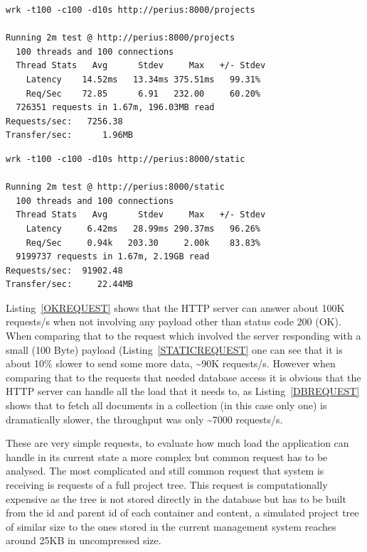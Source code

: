 \documentclass[a4paper,12pt]{article}
\newenvironment{custommargins}[2]%
  {\addtolength{\leftskip}{#1}\addtolength{\rightskip}{#2}}{\par}
\begin{document}
\begin{custommargins}{0cm}{-2cm}
\begin{minipage}{\linewidth-1cm}
\begin{lstlisting}[label=DBREQUEST,caption=Result of MongoDB requests]
wrk -t100 -c100 -d10s http://perius:8000/projects

Running 2m test @ http://perius:8000/projects
  100 threads and 100 connections
  Thread Stats   Avg      Stdev     Max   +/- Stdev
    Latency    14.52ms   13.34ms 375.51ms   99.31%
    Req/Sec    72.85      6.91   232.00     60.20%
  726351 requests in 1.67m, 196.03MB read
Requests/sec:   7256.38
Transfer/sec:      1.96MB
\end{lstlisting}
\end{minipage}

\begin{minipage}{\linewidth-1cm}
\begin{lstlisting}[label=STATICREQUEST,caption=Result of static text requests]
wrk -t100 -c100 -d10s http://perius:8000/static

Running 2m test @ http://perius:8000/static
  100 threads and 100 connections
  Thread Stats   Avg      Stdev     Max   +/- Stdev
    Latency     6.42ms   28.99ms 290.37ms   96.26%
    Req/Sec     0.94k   203.30     2.00k    83.83%
  9199737 requests in 1.67m, 2.19GB read
Requests/sec:  91902.48
Transfer/sec:     22.44MB
\end{lstlisting}
\end{minipage}
\end{custommargins}

Listing~\ref{OKREQUEST} shows that the HTTP server can answer about 100K requests/s when not
involving any payload other than status code 200 (OK). When comparing that to the request which
involved the server responding with a small (100 Byte) payload (Listing~\ref{STATICREQUEST} one can
see that it is about 10\% slower to send some more data, \textasciitilde90K requests/s. However when
comparing that to the requests that needed database access it is obvious that the HTTP server can
handle all the load that it needs to, as Listing~\ref{DBREQUEST} shows that to fetch all documents
in a collection (in this case only one) is dramatically slower, the throughput was only
\textasciitilde7000 requests/s. 

\par These are very simple requests, to evaluate how much load the application can handle in its
current state a more complex but common request has to be analysed. The most complicated and still
common request that system is receiving is requests of a full project tree. This request is
computationally expensive as the tree is not stored directly in the database but has to be built
from the id and parent id of each container and content, a simulated project tree of similar size to
the ones stored in the current management system reaches around 25KB in uncompressed size.
\end{document}
